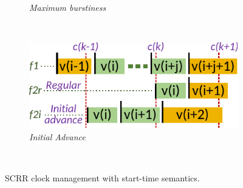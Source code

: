 \begin{figure}[t]
\begin{minipage}{.50\linewidth}
\begin{subfigure}[t]{1.0\linewidth}
            \vspace{-6mm}
            \caption{\small{\textit{Maximum burstiness}}}
	    \label{fig:burstiness-start}
	\end{subfigure}\\
        \vspace{1mm}
	\begin{subfigure}[t]{0.9\linewidth}
            \centering
            \includegraphics[width=1\linewidth]{figs/scrr-initial-advance-start.pdf}
            \vspace{-6mm}
            \caption{\small{\textit{Initial Advance}}}
	    \label{fig:initial-advance-start}
	\end{subfigure}
    \end{minipage}\\
    \vspace{-4mm}
    \caption{\small{SCRR clock management with start-time semantics.}}
    \label{fig:scrr-start}
    \vspace*{-0.4cm}

\end{figure}


